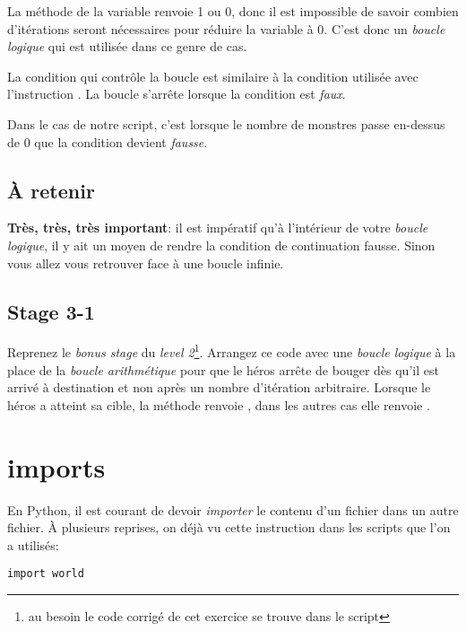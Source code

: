 La méthode  de la variable  renvoie 1 ou 0, donc il est impossible de savoir combien d'itérations seront nécessaires pour réduire la variable  à 0.
C'est donc un \emph{boucle logique} qui est utilisée dans ce genre de cas.

La condition qui contrôle la boucle est similaire à la condition utilisée avec l'instruction .
La boucle s'arrête lorsque la condition est \emph{faux}.

Dans le cas de notre script, c'est lorsque le nombre de monstres passe en-dessus de 0 que la condition devient \emph{fausse}.

\subsection{\`A retenir}

\textbf{Très, très, très important}: il est impératif qu'à l'intérieur de votre \emph{boucle logique}, il y ait un moyen de rendre la condition de continuation fausse. Sinon vous allez vous retrouver face à une boucle infinie. 

\subsection{Stage 3-1}

Reprenez le \textit{bonus stage} du \textit{level 2}\footnote{au besoin le code corrigé de cet exercice se trouve dans le script }. Arrangez ce code avec une \emph{boucle logique} à la place de la \emph{boucle arithmétique} pour que le héros arrête de bouger dès qu'il est arrivé à destination et non après un nombre d'itération arbitraire.
Lorsque le héros a atteint sa cible, la méthode  renvoie , dans les autres cas elle renvoie .

\section{imports}

En Python, il est courant de devoir \emph{importer} le contenu d'un fichier dans un autre fichier.
\`A plusieurs reprises, on déjà vu cette instruction dans les scripts que l'on a utilisés:

\begin{lstlisting}
import world
\end{lstlisting}

